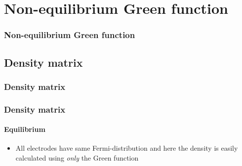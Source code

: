 \section{Non-equilibrium Green function}

\begin{framenologo}
  \frametitle{Non-equilibrium Green function}
  \tableofcontents[currentsection]
\end{framenologo}

\subsection{Density matrix}

\begin{frame}
  \frametitle{Density matrix}


\end{frame}

\begin{frame}
  \frametitle{Density matrix}
  \framesubtitle{Equilibrium}

  \begin{itemize}
    \item All electrodes have same Fermi-distribution and here the density is easily
    calculated using \emph{only} the Green function
  \end{itemize}

  
\end{frame}


